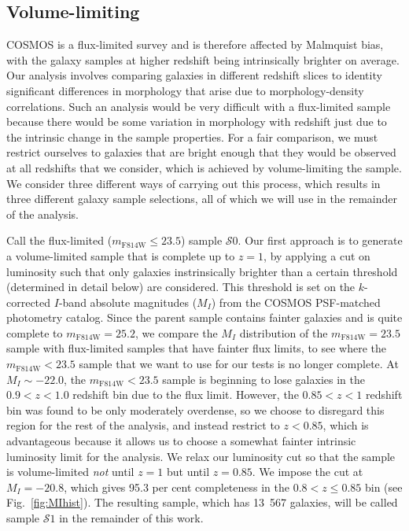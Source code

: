 \documentclass[twocolumn,useAMS,usenatbib]{mn2e}
\newcommand{\rachel}[1]{{\textcolor{red}{#1}}}
\newcommand{\s}{\ensuremath{\mathcal{S}}}
\begin{document}
\subsection{Volume-limiting}
\label{sub:volumelimiting}
 
COSMOS is a flux-limited survey and is therefore affected by Malmquist
bias, with the galaxy samples at higher redshift being intrinsically
brighter on average.  
Our analysis involves comparing galaxies in different redshift slices
to identity significant differences in morphology that arise due to
morphology-density correlations.  Such an analysis would be very
difficult with a flux-limited sample because there would be some
variation in morphology with redshift just due to the intrinsic change
in the sample properties.  For a fair comparison, we must restrict
ourselves to galaxies that are bright enough that they would be
observed at all redshifts that we consider, which is achieved by
volume-limiting the sample.  We consider three different ways of
carrying out this process, which results in three different galaxy
sample selections, all of which we will use in the remainder of the
analysis.

Call the flux-limited ($m_\text{F814W} \le 23.5$) sample \s$0$. Our first approach is to generate a volume-limited sample that is
complete up to $z=1$, by applying a cut on luminosity such that only
galaxies instrinsically brighter than a certain threshold (determined
in detail below) are considered. This threshold is set on the
$k$-corrected $I$-band absolute magnitudes ($M_I$) from the COSMOS PSF-matched
photometry catalog.   
Since the parent sample contains fainter galaxies and is quite
complete to $m_\text{F814W}=25.2$,
we compare the $M_I$ distribution
of the $m_\text{F814W}=23.5$ sample with flux-limited samples that
have fainter flux limits, to see where the $m_\text{F814W}<23.5$
sample that we want to use for our tests is no longer complete.
At $M_I\sim-22.0$, the
$m_\text{F814W}<23.5$ sample is beginning to lose galaxies in the
$0.9<z<1.0$ redshift bin due to the flux limit. However, the $0.85<z<1$
redshift bin was found to be only moderately overdense, so we choose
to disregard this region for the rest of the analysis, and instead
restrict to $z<0.85$, which is advantageous because it allows us to
choose a somewhat fainter intrinsic luminosity limit for the
analysis.  We relax our luminosity cut %
so that the sample is volume-limited \emph{not} until $z=1$ but until $z=0.85$. 
We impose the cut at $M_I=-20.8$, which gives 95.3 per cent completeness in
the $0.8 < z \le 0.85$ bin (see Fig.~\ref{fig:MIhist}). The resulting
sample, which has 13~567 galaxies, will be called sample \s$1$ in the remainder
of this work.
\end{document}
